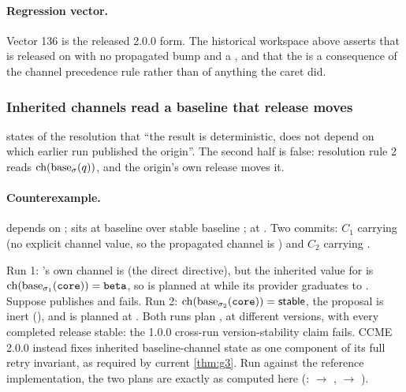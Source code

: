 \paragraph{Regression vector.} Vector 136 is the released 2.0.0 form. The historical workspace above asserts that  is
released on  with no propagated bump and a , and that the
 is a consequence of the channel precedence rule rather than of
anything the caret did.

\subsubsection{Inherited channels read a baseline that release moves}

\begin{obligation}
\label{ob:origin}
 states of the  resolution that ``the result is
deterministic, does not depend on which earlier run published the origin''.
The second half is false: resolution rule 2 reads
$\mathrm{ch}(\mathrm{base}_{\sigma}(q))$, and the origin's own release moves it.
\end{obligation}

\paragraph{Counterexample.}  depends on ; 
sits at baseline  over stable baseline ;
 at . Two commits: $C_1$ carrying
 (no explicit channel value, so the propagated
channel is ) and $C_2$ carrying
.

Run 1: 's own channel is \stable{} (the direct directive), but
the inherited value for  is
$\mathrm{ch}(\mathrm{base}_{\sigma_1}(\texttt{core})) = \texttt{beta}$, so  is
planned at  while its provider graduates to
. Suppose  publishes and  fails. Run 2:
$\mathrm{ch}(\mathrm{base}_{\sigma_2}(\texttt{core})) = \mathsf{stable}$, the proposal is inert
(), and  is planned at . Both runs plan
, at different versions, with every completed release stable:
the 1.0.0 cross-run version-stability claim fails. CCME 2.0.0 instead fixes inherited baseline-channel state as one component of its full retry invariant, as required by current \cref{thm:g3}. Run against the reference implementation, the two
plans are exactly as computed here (: 
$\rightarrow$ ,  $\rightarrow$
).

